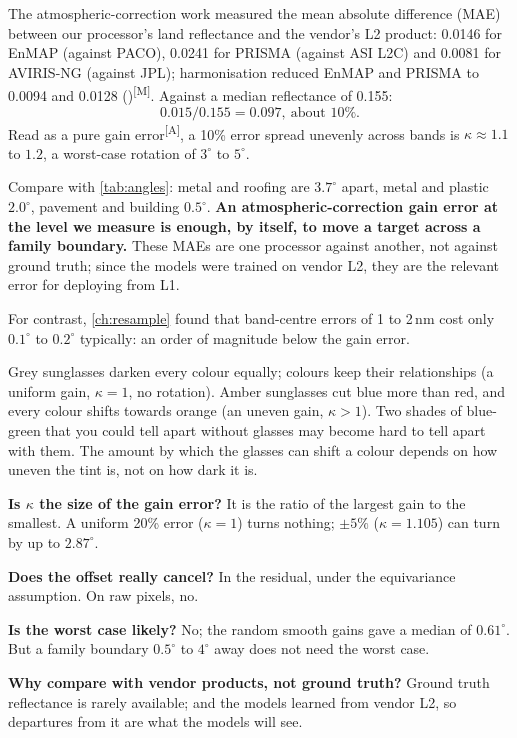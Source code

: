 \documentclass[11pt,a4paper,oneside,openany]{book}
\newcommand{\meas}{\textsuperscript{\textsf{\scriptsize[M]}}}
\newcommand{\assm}{\textsuperscript{\textsf{\scriptsize[A]}}}
\begin{document}
The atmospheric-correction work measured the mean absolute difference (MAE) between our processor's land reflectance and the vendor's L2 product: 0.0146 for EnMAP
(against PACO), 0.0241 for PRISMA (against ASI L2C) and 0.0081 for AVIRIS-NG (against JPL); harmonisation reduced EnMAP and PRISMA to 0.0094 and 0.0128
()\meas. Against a median reflectance of 0.155:
\[
  0.015/0.155=0.097,\ \text{about 10\%.}
\]
Read as a pure gain error\assm, a 10\% error spread unevenly across bands is $\kappa\approx1.1$ to $1.2$, a worst-case rotation of $3^\circ$ to $5^\circ$.

Compare with \cref{tab:angles}: metal and roofing are $3.7^\circ$ apart, metal and plastic $2.0^\circ$, pavement and building $0.5^\circ$. \textbf{An atmospheric-correction gain
error at the level we measure is enough, by itself, to move a target across a family boundary.} These MAEs are one processor against another, not against ground
truth; since the models were trained on vendor L2, they are the relevant error for deploying from L1.

For contrast, \cref{ch:resample} found that band-centre errors of 1 to 2\,nm cost only $0.1^\circ$ to $0.2^\circ$ typically: an order of magnitude below the gain error.

\begin{analogy}
Grey sunglasses darken every colour equally; colours keep their relationships (a uniform gain, $\kappa=1$, no rotation). Amber sunglasses cut blue more than red, and
every colour shifts towards orange (an uneven gain, $\kappa>1$). Two shades of blue-green that you could tell apart without glasses may become hard to tell apart with
them. The amount by which the glasses can shift a colour depends on how uneven the tint is, not on how dark it is.
\end{analogy}

\begin{confusions}
\textbf{Is $\kappa$ the size of the gain error?} It is the ratio of the largest gain to the smallest. A uniform 20\% error ($\kappa=1$) turns nothing; $\pm5\%$ ($\kappa=1.105$)
can turn by up to $2.87^\circ$.

\textbf{Does the offset really cancel?} In the residual, under the equivariance assumption. On raw pixels, no.

\textbf{Is the worst case likely?} No; the random smooth gains gave a median of $0.61^\circ$. But a family boundary $0.5^\circ$ to $4^\circ$ away does not need the worst case.

\textbf{Why compare with vendor products, not ground truth?} Ground truth reflectance is rarely available; and the models learned from vendor L2, so departures from it
are what the models will see.
\end{confusions}
\end{document}
